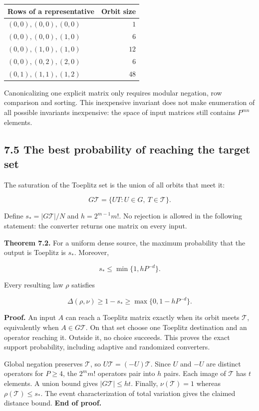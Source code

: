 \documentclass[
]{article}
\begin{document}
\begin{longtable}[]{@{}lr@{}}
\toprule\noalign{}
Rows of a representative & Orbit size \\
\midrule\noalign{}
\endhead
\bottomrule\noalign{}
\endlastfoot
\((0,0),(0,0),(0,0)\) & \(1\) \\
\((0,0),(0,0),(1,0)\) & \(6\) \\
\((0,0),(1,0),(1,0)\) & \(12\) \\
\((0,0),(0,2),(2,0)\) & \(6\) \\
\((0,1),(1,1),(1,2)\) & \(48\) \\
\end{longtable}

Canonicalizing one explicit matrix only requires modular negation, row
comparison and sorting. This inexpensive invariant does not make
enumeration of all possible invariants inexpensive: the space of input
matrices still contains \(P^{mn}\) elements.

\subsection{7.5 The best probability of reaching the target
set}\label{the-best-probability-of-reaching-the-target-set}

The saturation of the Toeplitz set is the union of all orbits that meet
it:

\[
G\mathcal T=\{UT:U\in G,\ T\in\mathcal T\}.
\]

Define \(s_* = |G\mathcal T|/N\) and \(h=2^{m-1}m!\). No rejection is
allowed in the following statement: the converter returns one matrix on
every input.

\textbf{Theorem 7.2.} For a uniform dense source, the maximum
probability that the output is Toeplitz is \(s_*\). Moreover,

\[
s_*\le\min\{1,hP^{-d}\}.
\]

Every resulting law \(\rho\) satisfies

\[
\Delta(\rho,\nu)\ge1-s_*
\ge\max\{0,1-hP^{-d}\}.
\]

\textbf{Proof.} An input \(A\) can reach a Toeplitz matrix exactly when
its orbit meets \(\mathcal T\), equivalently when \(A\in G\mathcal T\).
On that set choose one Toeplitz destination and an operator reaching it.
Outside it, no choice succeeds. This proves the exact support
probability, including adaptive and randomized converters.

Global negation preserves \(\mathcal T\), so
\(U\mathcal T=(-U)\mathcal T\). Since \(U\) and \(-U\) are distinct
operators for \(P\ge4\), the \(2^m m!\) operators pair into \(h\) pairs.
Each image of \(\mathcal T\) has \(t\) elements. A union bound gives
\(|G\mathcal T|\le ht\). Finally, \(\nu(\mathcal T)=1\) whereas
\(\rho(\mathcal T)\le s_*\). The event characterization of total
variation gives the claimed distance bound. \textbf{End of proof.}
\end{document}
